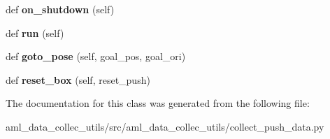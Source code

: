 \begin{DoxyCompactItemize}
def {\bfseries on\+\_\+shutdown} (self)
\item 
\hypertarget{classaml__data__collec__utils_1_1collect__push__data_1_1_push_machine_acf782a6ef77803f6c01a36948af28f74}{}\label{classaml__data__collec__utils_1_1collect__push__data_1_1_push_machine_acf782a6ef77803f6c01a36948af28f74} 
def {\bfseries run} (self)
\item 
\hypertarget{classaml__data__collec__utils_1_1collect__push__data_1_1_push_machine_a0e6d345e9f762ff9799f4f790e6693e1}{}\label{classaml__data__collec__utils_1_1collect__push__data_1_1_push_machine_a0e6d345e9f762ff9799f4f790e6693e1} 
def {\bfseries goto\+\_\+pose} (self, goal\+\_\+pos, goal\+\_\+ori)
\item 
\hypertarget{classaml__data__collec__utils_1_1collect__push__data_1_1_push_machine_a5bce8f24e55814302c0974ddcb43ad14}{}\label{classaml__data__collec__utils_1_1collect__push__data_1_1_push_machine_a5bce8f24e55814302c0974ddcb43ad14} 
def {\bfseries reset\+\_\+box} (self, reset\+\_\+push)
\end{DoxyCompactItemize}


The documentation for this class was generated from the following file\+:\begin{DoxyCompactItemize}
\item 
aml\+\_\+data\+\_\+collec\+\_\+utils/src/aml\+\_\+data\+\_\+collec\+\_\+utils/collect\+\_\+push\+\_\+data.\+py\end{DoxyCompactItemize}
